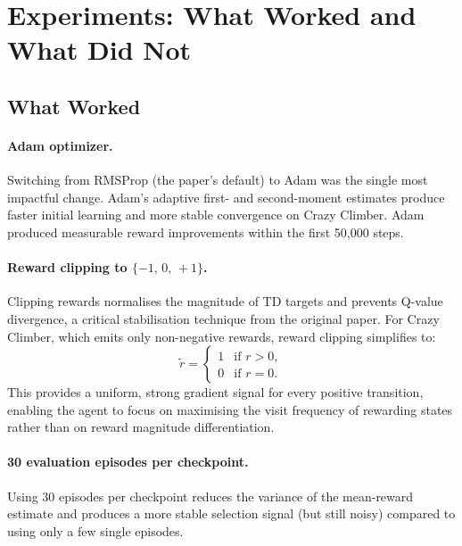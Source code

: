 \documentclass[11pt,a4paper]{article}
\begin{document}
\section{Experiments: What Worked and What Did Not}
\label{sec:experiments}

\subsection{What Worked}

\paragraph{Adam optimizer.}
Switching from RMSProp (the paper's default) to Adam was the single most
impactful change.
Adam's adaptive first- and second-moment estimates produce faster initial
learning and more stable convergence on Crazy Climber.
Adam produced measurable reward improvements within the first 50{,}000 steps.

\paragraph{Reward clipping to $\{-1,\,0,\,+1\}$.}
Clipping rewards normalises the magnitude of TD targets and prevents
Q-value divergence, a critical stabilisation technique from the original
paper.
For Crazy Climber, which emits only non-negative rewards, reward clipping
simplifies to:
\begin{equation}
  \tilde{r} =
  \begin{cases}
    1 & \text{if } r > 0, \\
    0 & \text{if } r = 0.
  \end{cases}
\end{equation}
This provides a uniform, strong gradient signal for every positive
transition, enabling the agent to focus on maximising the visit frequency
of rewarding states rather than on reward magnitude differentiation.

\paragraph{30 evaluation episodes per checkpoint.}
Using 30 episodes per checkpoint reduces the variance of the mean-reward
estimate and produces a more stable selection signal (but still noisy) 
compared to using only a few single episodes.
\end{document}

